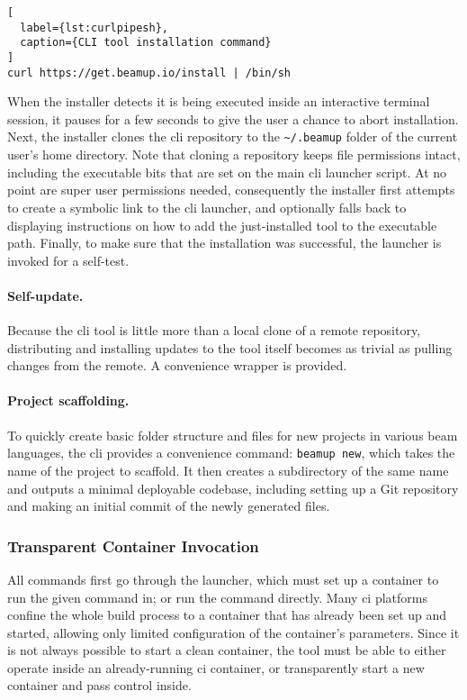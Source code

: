\begin{lstlisting}[
  label={lst:curlpipesh},
  caption={CLI tool installation command}
]
curl https://get.beamup.io/install | /bin/sh
\end{lstlisting}

When the installer detects it is being executed inside an interactive terminal session, it pauses for a few seconds to give the user a chance to abort installation. Next, the installer clones the \acrshort{cli} repository to the \lstinline|~/.beamup| folder of the current user's home directory. Note that cloning a repository keeps file permissions intact, including the executable bits that are set on the main \acrshort{cli} launcher script. At no point are super user permissions needed, consequently the installer first attempts to create a symbolic link to the \acrshort{cli} launcher, and optionally falls back to displaying instructions on how to add the just-installed tool to the executable path. Finally, to make sure that the installation was successful, the launcher is invoked for a self-test.

\paragraph{Self-update.} Because the \acrshort{cli} tool is little more than a local clone of a remote repository, distributing and installing updates to the tool itself becomes as trivial as pulling changes from the remote. A convenience wrapper is provided.

\paragraph{Project scaffolding.} To quickly create basic folder structure and files for new projects in various \acrshort{beam} languages, the \acrshort{cli} provides a convenience command: \lstinline|beamup new|, which takes the name of the project to scaffold. It then creates a subdirectory of the same name and outputs a minimal deployable codebase, including setting up a Git repository and making an initial commit of the newly generated files.

\subsubsection{Transparent Container Invocation}

All commands first go through the launcher, which must set up a container to run the given command in; or run the command directly. Many \acrshort{ci} platforms confine the whole build process to a container that has already been set up and started, allowing only limited configuration of the container's parameters. Since it is not always possible to start a clean container, the tool must be able to either operate inside an already-running \acrshort{ci} container, or transparently start a new container and pass control inside.

